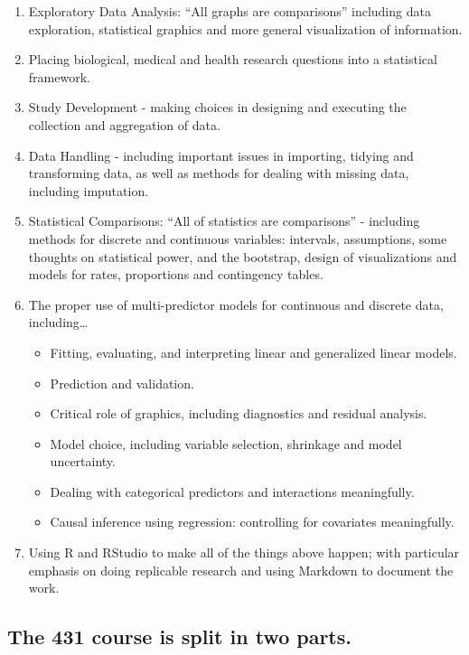 \documentclass[
]{book}
\providecommand{\tightlist}{%
  \setlength{\itemsep}{0pt}\setlength{\parskip}{0pt}}
\begin{document}
\begin{enumerate}
\def\labelenumi{\arabic{enumi}.}
\tightlist
\item
  Exploratory Data Analysis: ``All graphs are comparisons'' including data exploration, statistical graphics and more general visualization of information.
\item
  Placing biological, medical and health research questions into a statistical framework.
\item
  Study Development - making choices in designing and executing the collection and aggregation of data.
\item
  Data Handling - including important issues in importing, tidying and transforming data, as well as methods for dealing with missing data, including imputation.
\item
  Statistical Comparisons: ``All of statistics are comparisons'' - including methods for discrete and continuous variables: intervals, assumptions, some thoughts on statistical power, and the bootstrap, design of visualizations and models for rates, proportions and contingency tables.
\item
  The proper use of multi-predictor models for continuous and discrete data, including\ldots{}

  \begin{itemize}
  \tightlist
  \item
    Fitting, evaluating, and interpreting linear and generalized linear models.
  \item
    Prediction and validation.
  \item
    Critical role of graphics, including diagnostics and residual analysis.
  \item
    Model choice, including variable selection, shrinkage and model uncertainty.
  \item
    Dealing with categorical predictors and interactions meaningfully.
  \item
    Causal inference using regression: controlling for covariates meaningfully.
  \end{itemize}
\item
  Using R and RStudio to make all of the things above happen; with particular emphasis on doing replicable research and using Markdown to document the work.
\end{enumerate}

\hypertarget{the-431-course-is-split-in-two-parts.}{%
\subsection{The 431 course is split in two parts.}\label{the-431-course-is-split-in-two-parts.}}
\end{document}
